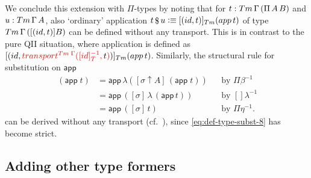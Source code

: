 \documentclass[a4paper,UKenglish,numberwithinsect,cleveref,thm-restate]{lipics-v2021}
\begin{document}
We conclude this extension with $\Pi$-types by noting that for $t : \Tm\,\Gamma\,(\Pi\,A\,B)$ and $u : \Tm\,\Gamma\,A$, also `ordinary' application
$t \mathop{\$} u \defeq [ (\idS , t) ]_{\Tm} (\mathsf{app}\,t)$ of type $\Tm\,\Gamma\,([(\idS , t)] B)$ can be defined without any transport. This is in contrast to the pure QII situation, where application is defined as $[ (\idS, \alert{\transfib{\Tm\;\Gamma}{[id]_T^{-1}}{\color{black}t}}) ]_{\Tm} (\mathsf{app}\,t)$.
%
Similarly, the structural rule for substitution on $\mathsf{app}$
\begin{align*}
  [\sigma \uparrow A ]\,(\mathsf{app}\;t) & = \mathsf{app}\,\lambda([\sigma \uparrow A ]\,(\mathsf{app}\;t)) && \text{by $\Pi\beta^{-1}$} \\
                                              & = \mathsf{app}\,\left([\sigma]\,\lambda\,(\mathsf{app}\,t)\right) && \text{by $[]\lambda^{-1}$} \\
                                              & = \mathsf{app}\,([\sigma]\,t) && \text{by $\Pi\eta^{-1}$.}
\end{align*}
can be derived without any transport (cf.\ \cite{Altenkirch2016a}), since \eqref{eq:def-type-subst-8} has become strict. 


\subsection{Adding other type formers} \label{subsec:SC+U+Pi+more}
\end{document}
